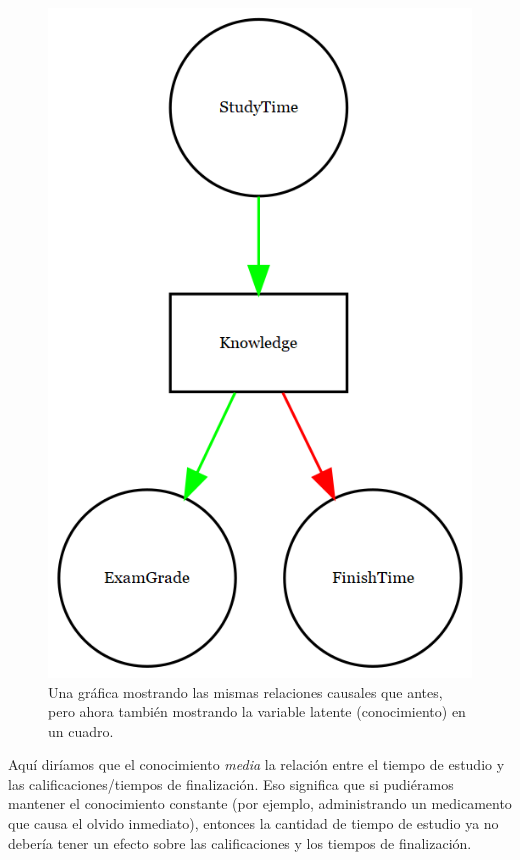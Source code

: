 \documentclass[
  12pt,
]{book}
\begin{document}
\begin{figure}
\includegraphics[width=6.94in,height=0.5\textheight]{images/dag_latent_example} \caption{Una gráfica mostrando las mismas relaciones causales que antes, pero ahora también mostrando la variable latente (conocimiento) en un cuadro.}\label{fig:latentCausalGraph}
\end{figure}

Aquí diríamos que el conocimiento \emph{media} la relación entre el tiempo de estudio y las calificaciones/tiempos de finalización. Eso significa que si pudiéramos mantener el conocimiento constante (por ejemplo, administrando un medicamento que causa el olvido inmediato), entonces la cantidad de tiempo de estudio ya no debería tener un efecto sobre las calificaciones y los tiempos de finalización.
\end{document}
